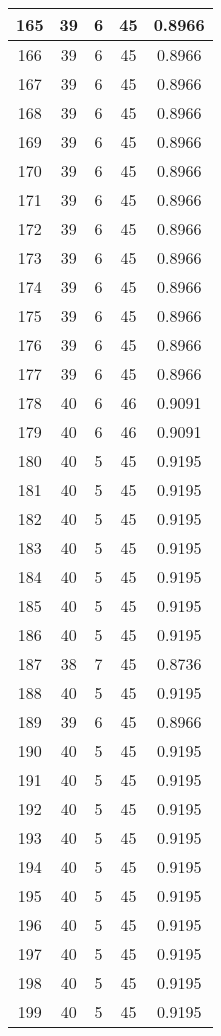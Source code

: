\documentclass[letterpaper, 12pt]{article}
\begin{document}
\begin{longtable}{|c|c|c|c|c|}
\hline
165 & 39 & 6 & 45 & 0.8966 \\
\hline
166 & 39 & 6 & 45 & 0.8966 \\
\hline
167 & 39 & 6 & 45 & 0.8966 \\
\hline
168 & 39 & 6 & 45 & 0.8966 \\
\hline
169 & 39 & 6 & 45 & 0.8966 \\
\hline
170 & 39 & 6 & 45 & 0.8966 \\
\hline
171 & 39 & 6 & 45 & 0.8966 \\
\hline
172 & 39 & 6 & 45 & 0.8966 \\
\hline
173 & 39 & 6 & 45 & 0.8966 \\
\hline
174 & 39 & 6 & 45 & 0.8966 \\
\hline
175 & 39 & 6 & 45 & 0.8966 \\
\hline
176 & 39 & 6 & 45 & 0.8966 \\
\hline
177 & 39 & 6 & 45 & 0.8966 \\
\hline
178 & 40 & 6 & 46 & 0.9091 \\
\hline
179 & 40 & 6 & 46 & 0.9091 \\
\hline
180 & 40 & 5 & 45 & 0.9195 \\
\hline
181 & 40 & 5 & 45 & 0.9195 \\
\hline
182 & 40 & 5 & 45 & 0.9195 \\
\hline
183 & 40 & 5 & 45 & 0.9195 \\
\hline
184 & 40 & 5 & 45 & 0.9195 \\
\hline
185 & 40 & 5 & 45 & 0.9195 \\
\hline
186 & 40 & 5 & 45 & 0.9195 \\
\hline
187 & 38 & 7 & 45 & 0.8736 \\
\hline
188 & 40 & 5 & 45 & 0.9195 \\
\hline
189 & 39 & 6 & 45 & 0.8966 \\
\hline
190 & 40 & 5 & 45 & 0.9195 \\
\hline
191 & 40 & 5 & 45 & 0.9195 \\
\hline
192 & 40 & 5 & 45 & 0.9195 \\
\hline
193 & 40 & 5 & 45 & 0.9195 \\
\hline
194 & 40 & 5 & 45 & 0.9195 \\
\hline
195 & 40 & 5 & 45 & 0.9195 \\
\hline
196 & 40 & 5 & 45 & 0.9195 \\
\hline
197 & 40 & 5 & 45 & 0.9195 \\
\hline
198 & 40 & 5 & 45 & 0.9195 \\
\hline
199 & 40 & 5 & 45 & 0.9195 \\
\hline
\end{longtable}
\end{document}
